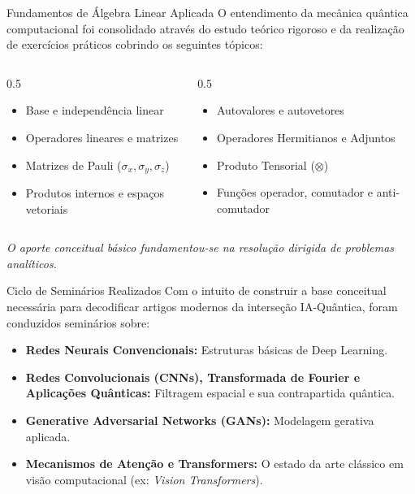 \documentclass[aspectratio=169, 11pt]{beamer}
\begin{document}
\begin{frame}{Fundamentos de Álgebra Linear Aplicada}
    O entendimento da mecânica quântica computacional foi consolidado através do estudo teórico rigoroso e da realização de exercícios práticos cobrindo os seguintes tópicos:
    
    \vspace{0.2cm}
    \begin{columns}[T]
        \begin{column}{0.5\textwidth}
            \begin{itemize}
                \item Base e independência linear
                \item Operadores lineares e matrizes
                \item Matrizes de Pauli ($\sigma_x, \sigma_y, \sigma_z$)
                \item Produtos internos e espaços vetoriais
            \end{itemize}
        \end{column}
        \begin{column}{0.5\textwidth}
            \begin{itemize}
                \item Autovalores e autovetores
                \item Operadores Hermitianos e Adjuntos
                \item Produto Tensorial ($\otimes$)
                \item Funções operador, comutador e anti-comutador
            \end{itemize}
        \end{column}
    \end{columns}
    \vspace{0.4cm}
    \centering
    \textit{\small O aporte conceitual básico fundamentou-se na resolução dirigida de problemas analíticos.}
\end{frame}

\begin{frame}{Ciclo de Seminários Realizados}
    Com o intuito de construir a base conceitual necessária para decodificar artigos modernos da interseção IA-Quântica, foram conduzidos seminários sobre:
    
    \vspace{0.3cm}
    \begin{itemize}
        \item \textbf{Redes Neurais Convencionais:} Estruturas básicas de Deep Learning.
        \item \textbf{Redes Convolucionais (CNNs), Transformada de Fourier e Aplicações Quânticas:} Filtragem espacial e sua contrapartida quântica.
        \item \textbf{Generative Adversarial Networks (GANs):} Modelagem gerativa aplicada.
        \item \textbf{Mecanismos de Atenção e Transformers:} O estado da arte clássico em visão computacional (ex: \textit{Vision Transformers}).
    \end{itemize}
\end{frame}
\end{document}
